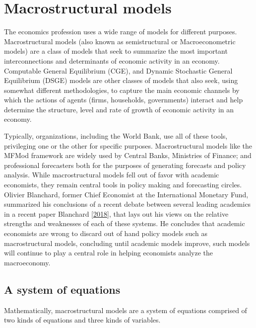 \documentclass[letterpaper,10pt,english]{jupyterBook}
\begin{document}
\chapter{Macrostructural models}
\label{\detokenize{content/02_MacrostructuralModels/MacroStructuralModels:macrostructural-models}}\label{\detokenize{content/02_MacrostructuralModels/MacroStructuralModels::doc}}
\sphinxAtStartPar
The economics profession uses a wide range of models for different purposes.  Macro\sphinxhyphen{}structural models (also known as semi\sphinxhyphen{}structural or Macro\sphinxhyphen{}econometric models) are a class of models that seek to summarize the most important interconnections and determinants of economic activity in an economy. Computable General Equilibrium (CGE), and Dynamic Stochastic General Equilibrium (DSGE) models are other classes of models that also seek, using somewhat different methodologies, to capture the main economic channels by which the actions of agents (firms, households, governments) interact and help determine the structure, level and rate of growth of economic activity in an economy.

\sphinxAtStartPar
Typically, organizations, including the World Bank, use all of these tools, privileging one or the other for specific purposes. Macrostructural models like the MFMod framework are widely used by Central Banks, Ministries of Finance; and professional forecasters both for the purposes of generating forecasts and policy analysis. While macrostructural models fell out of favor with academic economists, they remain central tools in policy making and forecasting circles. Olivier Blanchard, former Chief Economist at the International Monetary Fund, summarized his conclusions of a recent debate between several leading academics in a recent paper Blanchard {[}\hyperlink{cite.content/99_BackMatter/References:id17}{2018}{]}, that lays out his views on the relative strengths and weaknesses of each of these systems. He concludes that academic economists are wrong to discard out of hand policy models such as macro\sphinxhyphen{}structural models, concluding until academic models improve, such models will continue to play a central role in helping economists analyze the macro\sphinxhyphen{}economy.


\section{A system of equations}
\label{\detokenize{content/02_MacrostructuralModels/MacroStructuralModels:a-system-of-equations}}
\sphinxAtStartPar
Mathematically, macro\sphinxhyphen{}structural models are a system of equations comprised of two kinds of equations and three kinds of variables.
\end{document}
